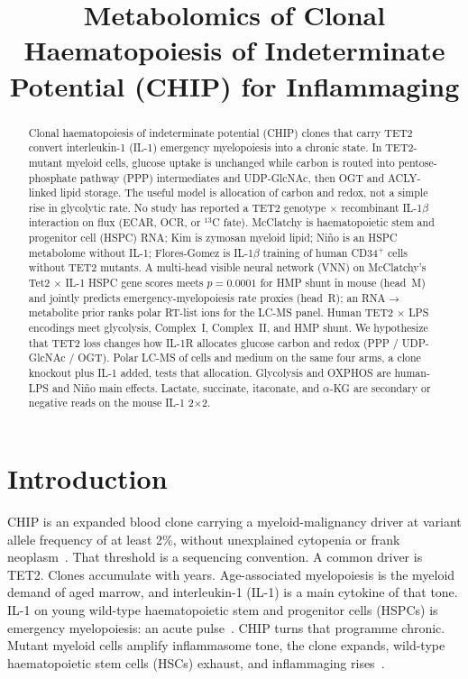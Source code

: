 \documentclass[11pt]{article}
\title{Metabolomics of Clonal Haematopoiesis of Indeterminate Potential (CHIP) for Inflammaging \\
}
\author{}
\date{}
\begin{document}
\maketitle

\begin{abstract}
    Clonal haematopoiesis of indeterminate potential (CHIP) clones that carry TET2
    convert interleukin-1 (IL-1) emergency myelopoiesis into a chronic state. In
    TET2-mutant myeloid cells, glucose uptake is unchanged while carbon is routed into
    pentose-phosphate pathway (PPP) intermediates and UDP-GlcNAc, then OGT and
    ACLY-linked lipid storage. The useful model is allocation of carbon and redox, not
    a simple rise in glycolytic rate. No study has reported a TET2 genotype $\times$
    recombinant IL-1$\beta$ interaction on flux (ECAR, OCR, or $^{13}$C fate). McClatchy
    is haematopoietic stem and progenitor cell (HSPC) RNA; Kim is zymosan myeloid lipid;
    Ni{\~n}o is an HSPC metabolome without IL-1; Flores-Gomez is IL-1$\beta$ training of
    human CD34$^{+}$ cells without TET2 mutants. A multi-head visible neural network (VNN)
    on McClatchy's Tet2 $\times$ IL-1 HSPC gene scores meets $p=0.0001$ for HMP shunt in
    mouse (head~M) and jointly predicts emergency-myelopoiesis rate proxies (head~R);
    an RNA$\to$metabolite prior ranks polar RT-list ions for the LC-MS panel. Human TET2
    $\times$ LPS encodings meet glycolysis, Complex~I, Complex~II, and HMP shunt. We
    hypothesize that TET2 loss changes how IL-1R allocates glucose carbon and redox
    (PPP / UDP-GlcNAc / OGT). Polar LC-MS of cells and medium on the same four arms, a
    clone knockout plus IL-1 added, tests that allocation. Glycolysis and OXPHOS are
    human-LPS and Ni{\~n}o main effects. Lactate, succinate, itaconate, and $\alpha$-KG
    are secondary or negative reads on the mouse IL-1 2$\times$2.
\end{abstract}

\section*{Introduction}

CHIP is an expanded blood clone carrying a myeloid-malignancy driver at variant allele
frequency of at least 2\%, without unexplained cytopenia or frank
neoplasm~\cite{Steensma2015CHIP}. That threshold is a sequencing convention. A common
driver is TET2. Clones accumulate with years. Age-associated myelopoiesis is the myeloid
demand of aged marrow, and interleukin-1 (IL-1) is a main cytokine of that tone. IL-1 on
young wild-type haematopoietic stem and progenitor cells (HSPCs) is emergency
myelopoiesis: an acute pulse~\cite{Pietras2016IL1HSC}. CHIP turns that programme
chronic. Mutant myeloid cells amplify inflammasome tone, the clone expands, wild-type
haematopoietic stem cells (HSCs) exhaust, and inflammaging
rises~\cite{Hajishengallis2026CHIPinflammaging}.
\end{document}
